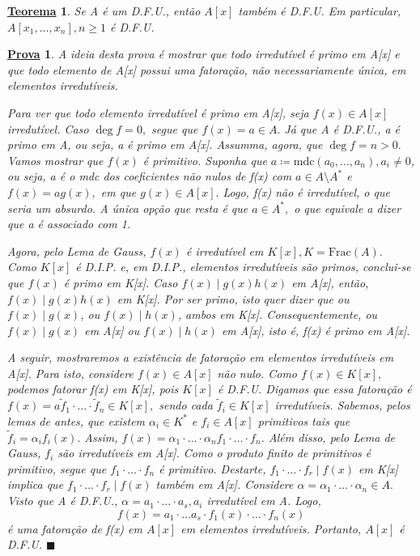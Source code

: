 \documentclass{article}
\newtheorem*{theorem*}{\underline{Teorema}}
\newtheorem*{proof*}{\underline{Prova}}
\renewcommand\qedsymbol{$\blacksquare$}
\begin{document}
\begin{theorem*}
  Se A é um D.F.U., então \(A[x]\) também é D.F.U. Em particular, \(A[x_{1}, \dotsc , x_{n}], n\geq 1\) é D.F.U.
\end{theorem*}
\begin{proof*}
  A ideia desta prova é mostrar que todo irredutível é primo em A[x] e que todo elemento de A[x] possui uma fatoração, não necessariamente
única, em elementos irredutíveis.

  Para ver que todo elemento irredutível é primo em A[x], seja \(f(x)\in A[x]\) irredutível. Caso \(\deg{f} = 0,\) segue que \(f(x) = a\in A.\) Já 
que A é D.F.U., a é primo em A, ou seja, a é primo em A[x]. Assumma, agora, que \(\deg{f} = n > 0.\) Vamos mostrar que \(f(x)\) é primitivo. Suponha que
 \(a\coloneqq \mathrm{mdc}(a_{0}, \dotsc , a_{n}), a_{i}\neq 0\), ou seja, a é o mdc dos coeficientes não nulos de f(x) com \(a\in A\setminus{A^{*}} \) e
 \(f(x) = ag(x),\) em que \(g(x)\in A[x].\) Logo, f(x) não é irredutível, o que seria um absurdo. A única opção que resta é que \(a\in A^{*},\) o que equivale a dizer
 que a é associado com 1.

  Agora, pelo Lema de Gauss, \(f(x)\) é irredutível em \(K[x], K = \mathrm{Frac}(A).\) Como \(K[x]\) é D.I.P. e, em D.I.P., elementos irredutíveis são primos,
conclui-se que \(f(x)\) é primo em K[x]. Caso \(f(x)\mid g(x)h(x)\) em A[x], então, \(f(x)\mid g(x)h(x)\) em K[x]. Por ser primo, isto quer dizer que ou
\(f(x)\mid g(x)\), ou \(f(x)\mid h(x)\), ambos em K[x]. Consequentemente, ou \(f(x)\mid g(x)\) em A[x] ou \(f(x)\mid h(x)\) em A[x], isto é, f(x) é primo em A[x].

A seguir, mostraremos a existência de fatoração em elementos irredutíveis em A[x]. Para isto, considere \(f(x)\in A[x]\) não nulo. Como \(f(x)\in K[x],\)
podemos fatorar f(x) em K[x], pois \(K[x]\) é D.F.U. Digamos que essa fatoração é \(f(x) = a\tilde{f}_{1}\cdot \dotsc \cdot \tilde{f}_{n}\in K[x],\) sendo cada
\(\tilde{f}_{i}\in K[x]\) irredutíveis. Sabemos, pelos lemas de antes, que existem \(\alpha_{i}\in K^{*}\) e \(f_{i}\in A[x]\) primitivos tais que \(\tilde{f}_{i} =
 \alpha_{i}f_{i}(x).\) Assim, \(f(x) = \alpha_{1}\cdot \dotsc \cdot \alpha_{n}f_{1}\cdot \dotsc \cdot f_{n}\). Além disso, pelo Lema de Gauss, \(f_{i}\) são irredutíveis
em A[x]. Como o produto finito de primitivos é primitivo, segue que \(f_{1}\cdot \dotsc \cdot f_{n}\) é primitivo. Destarte, \(f_{1}\cdot \dotsc \cdot f_{r}\mid f(x)\)
em K[x] implica que \(f_{1}\cdot \dotsc \cdot f_{r}\mid f(x)\) também em A[x]. Considere \(\alpha = \alpha _{1}\cdot \dotsc \cdot \alpha_{n}\in A.\) Visto que A é 
D.F.U., \(\alpha = a_{1}\cdot \dotsc \cdot a_{s}, a_{i}\) irredutível em A. Logo, 
  \[
    f(x) = a_{1}\cdot \dotsc a_{s}\cdot f_{1}(x)\cdot \dotsc \cdot f_{n}(x)
  \]
  é uma fatoração de f(x) em \(A[x]\) em elementos irredutíveis. Portanto, \(A[x]\) é D.F.U. \qedsymbol
\end{proof*}
\end{document}
